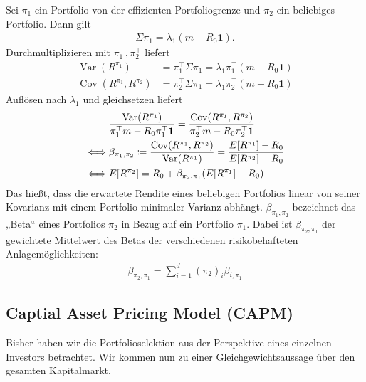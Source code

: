 \documentclass[a4paper,twoside,DIV15,BCOR12mm]{scrbook}
\DeclareMathOperator{\Var}{Var}
\DeclareMathOperator{\Cov}{Cov}
\begin{document}
Sei $\pi_1$ ein Portfolio von der effizienten Portfoliogrenze und $\pi_2$ ein beliebiges Portfolio. Dann gilt
\begin{align*}
\Sigma\pi_1 = \lambda_1(m-R_0\mathbf 1).
\end{align*}
Durchmultiplizieren mit $\pi_1^\top, \pi_2^\top$ liefert
\begin{align*}
\Var(R^{\pi_1}) &= \pi_1^\top \Sigma \pi_1 = \lambda_1\pi_1^\top(m-R_0\mathbf 1) \\
\Cov(R^{\pi_1},R^{\pi_2}) &= \pi_2^\top\Sigma \pi_1 = \lambda_1 \pi_2^\top (m-R_0\mathbf 1)
\end{align*}
Auflösen nach $\lambda_1$ und gleichsetzen liefert
\begin{align*}
& \frac{\Var(R^{\pi_1})}{\pi_1^\top m - R_0 \pi_1^\top \mathbf 1} = 
\frac{\Cov(R^{\pi_1},R^{\pi_2})}{\pi_2^\top m - R_0 \pi_2 ^\top \mathbf 1} \\
\iff & \beta_{\pi_1,\pi_2} \da 
\frac{\Cov(R^{\pi_1},R^{\pi_2})}{\Var(R^{\pi_1})} =
\frac{E[R^{\pi_1}]-R_0}{E[R^{\pi_2}]-R_0} \\
\iff & E[R^{\pi_2}] = R_0 + \beta_{\pi_2,\pi_1}(E[R^{\pi_1}]-R_0)
\end{align*}
Das hießt, dass die erwartete Rendite eines beliebigen Portfolios linear von seiner Kovarianz mit einem Portfolio minimaler Varianz abhängt. $\beta_{\pi_1,\pi_2}$ bezeichnet das „Beta“ eines Portfolios $\pi_2$ in Bezug auf ein Portfolio $\pi_1$. Dabei ist $\beta_{\pi_2,\pi_1}$ der gewichtete Mittelwert des Betas der verschiedenen risikobehafteten Anlagemöglichkeiten:
\begin{align*}
\beta_{\pi_2,\pi_1} = \sum_{i=1}^d (\pi_2)_i\beta_{i,\pi_1}
\end{align*}

\subsection{Captial Asset Pricing Model (CAPM)}

Bisher haben wir die Portfolioselektion aus der Perspektive eines einzelnen Investors betrachtet. Wir kommen nun zu einer Gleichgewichtsaussage über den gesamten Kapitalmarkt.
\end{document}

